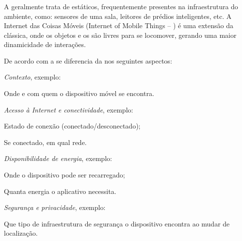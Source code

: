 \subsubsection{\iomt{}}

A \iot{} geralmente trata de \smartobjs{} estáticos, frequentemente presentes na infraestrutura do ambiente, como: sensores de uma sala, leitores \rfid{} de prédios inteligentes, etc. A Internet das Coisas Móveis (Internet of Mobile Things -- \iomt{}) é uma extensão da \iot{} clássica, onde os objetos e os \gateways{} são livres para se locomover, gerando uma maior dinamicidade de interações.

De acordo com  a \iomt{} se diferencia da \iot{} nos seguintes aspectos:
\begin{alineas}

	\item \emph{Contexto}, exemplo:
		
		\begin{alineas}

			\item Onde e com quem o dispositivo móvel se encontra.

		\end{alineas}

	\item \emph{Acesso à Internet e conectividade}, exemplo:
		
		\begin{alineas}

			\item Estado de conexão (conectado/desconectado);
				
			\item Se conectado, em qual rede.

		\end{alineas}

	\item \emph{Disponibilidade de energia}, exemplo:
		
		\begin{alineas}

			\item Onde o dispositivo pode ser recarregado;
				
			\item Quanta energia o aplicativo necessita.

		\end{alineas}

	\item \emph{Segurança e privacidade}, exemplo:
		
		\begin{alineas}

			\item Que tipo de infraestrutura de segurança o dispositivo encontra ao mudar de localização.

		\end{alineas}

\end{alineas}

